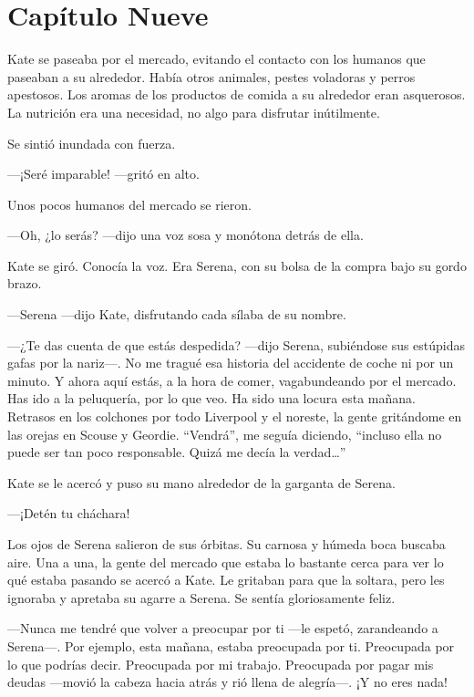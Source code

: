 \chapter*{Capítulo Nueve}

Kate se paseaba por el mercado, evitando el contacto con los humanos que
paseaban a su alrededor. Había otros animales, pestes voladoras y perros
apestosos. Los aromas de los productos de comida a su alrededor eran
asquerosos. La nutrición era una necesidad, no algo para disfrutar
inútilmente.

Se sintió inundada con fuerza.

---¡Seré imparable! ---gritó en alto.

Unos pocos humanos del mercado se rieron.

---Oh, ¿lo serás? ---dijo una voz sosa y monótona detrás de ella.

Kate se giró. Conocía la voz. Era Serena, con su bolsa de la compra bajo
su gordo brazo.

---Serena ---dijo Kate, disfrutando cada sílaba de su nombre.

---¿Te das cuenta de que estás despedida? ---dijo Serena, subiéndose sus
estúpidas gafas por la nariz---. No me tragué esa historia del accidente
de coche ni por un minuto. Y ahora aquí estás, a la hora de comer,
vagabundeando por el mercado. Has ido a la peluquería, por lo que veo.
Ha sido una locura esta mañana. Retrasos en los colchones por todo
Liverpool y el noreste, la gente gritándome en las orejas en Scouse y
Geordie. ``Vendrá'', me seguía diciendo, ``incluso ella no puede ser tan
poco responsable. Quizá me decía la verdad\ldots{}''

Kate se le acercó y puso su mano alrededor de la garganta de Serena.

---¡Detén tu cháchara!

Los ojos de Serena salieron de sus órbitas. Su carnosa y húmeda boca
buscaba aire. Una a una, la gente del mercado que estaba lo bastante
cerca para ver lo qué estaba pasando se acercó a Kate. Le gritaban para
que la soltara, pero les ignoraba y apretaba su agarre a Serena. Se
sentía gloriosamente feliz.

---Nunca me tendré que volver a preocupar por ti ---le espetó, zarandeando
a Serena---. Por ejemplo, esta mañana, estaba preocupada por ti.
Preocupada por lo que podrías decir. Preocupada por mi trabajo.
Preocupada por pagar mis deudas ---movió la cabeza hacia atrás y rió
llena de alegría---. ¡Y no eres nada!

